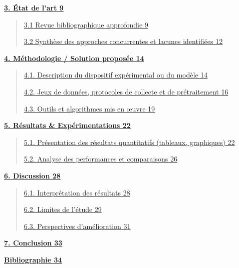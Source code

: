 \documentclass[
]{article}
\begin{document}
\protect\hyperlink{}{\textbf{3. État de l'art 9}}

\begin{quote}
\protect\hyperlink{revue-bibliographique-approfondie}{3.1 Revue bibliographique approfondie 9}

\protect\hyperlink{synthuxe8se-des-approches-concurrentes-et-lacunes-identifiuxe9es}{3.2 Synthèse des approches concurrentes et lacunes identifiées 12}
\end{quote}

\protect\hyperlink{muxe9thodologie-solution-proposuxe9e}{\textbf{4. Méthodologie / Solution proposée 14}}

\begin{quote}
\protect\hyperlink{description-du-dispositif-expuxe9rimental-ou-du-moduxe8le}{4.1. Description du dispositif expérimental ou du modèle 14}

\protect\hyperlink{jeux-de-donnuxe9es-protocoles-de-collecte-et-de-pruxe9traitement}{4.2. Jeux de données, protocoles de collecte et de prétraitement 16}

\protect\hyperlink{outils-et-algorithmes-mis-en-ux153uvre}{4.3. Outils et algorithmes mis en œuvre 19}
\end{quote}

\protect\hyperlink{ruxe9sultats-expuxe9rimentations}{\textbf{5. Résultats \& Expérimentations 22}}

\begin{quote}
\protect\hyperlink{pruxe9sentation-des-ruxe9sultats-quantitatifs-tableaux-graphiques}{5.1. Présentation des résultats quantitatifs (tableaux, graphiques) 22}

\protect\hyperlink{analyse-des-performances-et-comparaisons}{5.2. Analyse des performances et comparaisons 26}
\end{quote}

\protect\hyperlink{discussion}{\textbf{6. Discussion 28}}

\begin{quote}
\protect\hyperlink{interpruxe9tation-des-ruxe9sultats}{6.1. Interprétation des résultats 28}

\protect\hyperlink{limites-de-luxe9tude}{6.2. Limites de l'étude 29}

\protect\hyperlink{perspectives-damuxe9lioration}{6.3. Perspectives d'amélioration 31}
\end{quote}

\protect\hyperlink{conclusion}{\textbf{7. Conclusion 33}}

\protect\hyperlink{bibliographie}{\textbf{Bibliographie 34}}
\end{document}
